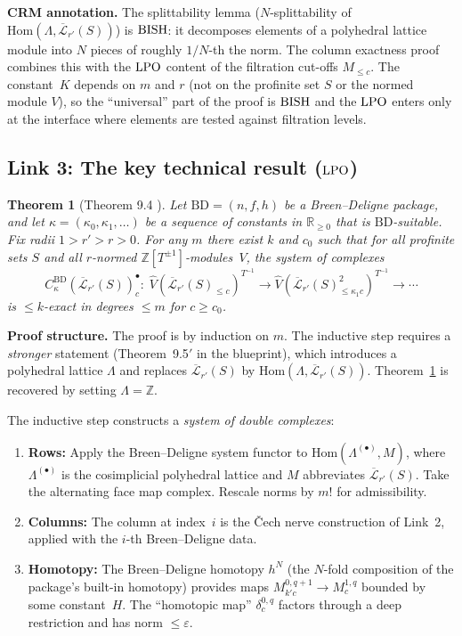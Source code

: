 \documentclass[11pt,a4paper]{article}
\theoremstyle{plain}
\newtheorem{theorem}{Theorem}[section]
\theoremstyle{definition}
\newcommand{\BISH}{\textup{BISH}}
\newcommand{\LPO}{\textup{LPO}}
\newcommand{\R}{\mathbb{R}}
\newcommand{\Z}{\mathbb{Z}}
\begin{document}
\medskip
\noindent\textbf{CRM annotation.}
The splittability lemma ($N$-splittability of $\mathrm{Hom}(\Lambda,
\overline{\mathcal{L}}_{r'}(S))$) is $\BISH$: it decomposes elements
of a polyhedral lattice module into $N$ pieces of roughly $1/N$-th
the norm.  The column exactness proof combines this with the $\LPO$
content of the filtration cut-offs $M_{\leq c}$.  The constant~$K$
depends on $m$ and $r$ (not on the profinite set $S$ or the normed
module $V$), so the ``universal'' part of the proof is $\BISH$ and
the $\LPO$ enters only at the interface where elements are tested
against filtration levels.

\subsection{Link 3: The key technical result ($\LPO$)}

\begin{theorem}[Theorem 9.4 {\cite{Scholze2019, Commelin2022}}]
\label{thm:94}
Let $\mathrm{BD} = (n, f, h)$ be a Breen--Deligne package, and let
$\kappa = (\kappa_0, \kappa_1, \ldots)$ be a sequence of constants
in $\R_{\geq 0}$ that is $\mathrm{BD}$-suitable.  Fix radii
$1 > r' > r > 0$.  For any $m$ there exist $k$ and $c_0$ such that
for all profinite sets $S$ and all $r$-normed
$\Z[T^{\pm 1}]$-modules~$V$, the system of complexes
\[
  C^{\mathrm{BD}}_\kappa(\overline{\mathcal{L}}_{r'}(S))^\bullet_c
  \colon \;
  \widehat{V}(\overline{\mathcal{L}}_{r'}(S)_{\leq c})^{T^{-1}}
  \longrightarrow
  \widehat{V}(\overline{\mathcal{L}}_{r'}(S)_{\leq \kappa_1 c}^2)^{T^{-1}}
  \longrightarrow \cdots
\]
is $\leq k$-exact in degrees $\leq m$ for $c \geq c_0$.
\end{theorem}

\noindent\textbf{Proof structure.}
The proof is by induction on $m$.  The inductive step requires a
\emph{stronger} statement (Theorem~9.5$'$ in the blueprint), which
introduces a polyhedral lattice $\Lambda$ and replaces
$\overline{\mathcal{L}}_{r'}(S)$ by
$\mathrm{Hom}(\Lambda, \overline{\mathcal{L}}_{r'}(S))$.
Theorem~\ref{thm:94} is recovered by setting $\Lambda = \Z$.

The inductive step constructs a \emph{system of double complexes}:
\begin{enumerate}[nosep]
\item \textbf{Rows:} Apply the Breen--Deligne system functor to
  $\mathrm{Hom}(\Lambda^{(\bullet)}, M)$, where $\Lambda^{(\bullet)}$
  is the cosimplicial polyhedral lattice and $M$ abbreviates
  $\overline{\mathcal{L}}_{r'}(S)$.  Take the alternating face map
  complex.  Rescale norms by $m!$ for admissibility.
\item \textbf{Columns:} The column at index~$i$ is the Čech nerve
  construction of Link~2, applied with the $i$-th Breen--Deligne data.
\item \textbf{Homotopy:} The Breen--Deligne homotopy $h^N$ (the
  $N$-fold composition of the package's built-in homotopy) provides
  maps $M^{0,q+1}_{k'c} \to M^{1,q}_c$ bounded by some constant~$H$.
  The ``homotopic map'' $\delta^{0,q}_c$ factors through a deep
  restriction and has norm $\leq \varepsilon$.
\end{enumerate}
\end{document}

